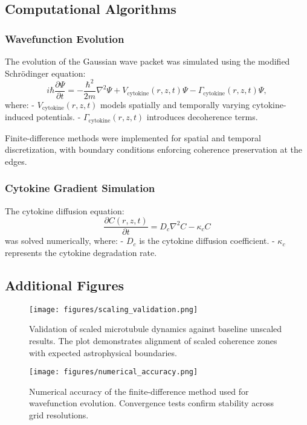 \subsection{Computational Algorithms}

\subsubsection{Wavefunction Evolution}

The evolution of the Gaussian wave packet was simulated using the modified Schr\"odinger equation:
\[
i\hbar \frac{\partial \Psi}{\partial t} = -\frac{\hbar^2}{2m} \nabla^2 \Psi + V_{\text{cytokine}}(r, z, t) \Psi - \Gamma_{\text{cytokine}}(r, z, t) \Psi,
\]
where:
- \(V_{\text{cytokine}}(r, z, t)\) models spatially and temporally varying cytokine-induced potentials.
- \(\Gamma_{\text{cytokine}}(r, z, t)\) introduces decoherence terms.

Finite-difference methods were implemented for spatial and temporal discretization, with boundary conditions enforcing coherence preservation at the edges.

\subsubsection{Cytokine Gradient Simulation}

The cytokine diffusion equation:
\[
\frac{\partial C(r, z, t)}{\partial t} = D_c \nabla^2 C - \kappa_c C
\]
was solved numerically, where:
- \(D_c\) is the cytokine diffusion coefficient.
- \(\kappa_c\) represents the cytokine degradation rate.

\subsection{Additional Figures}

\begin{figure}[H]
\centering
\texttt{[image: figures/scaling\_validation.png]}
\caption{Validation of scaled microtubule dynamics against baseline unscaled results. The plot demonstrates alignment of scaled coherence zones with expected astrophysical boundaries.}
\label{fig:scaling_validation}
\end{figure}

\begin{figure}[H]
\centering
\texttt{[image: figures/numerical\_accuracy.png]}
\caption{Numerical accuracy of the finite-difference method used for wavefunction evolution. Convergence tests confirm stability across grid resolutions.}
\label{fig:numerical_accuracy}
\end{figure}

